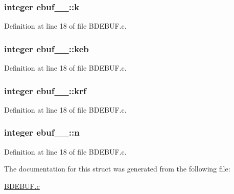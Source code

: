 \subsubsection[{\texorpdfstring{k}{k}}]{\setlength{\rightskip}{0pt plus 5cm}integer ebuf\+\_\+\_\+\+::k}\hypertarget{structebuf__1___a875fe82be4f3439c75f7fe6a957cc627}{}\label{structebuf__1___a875fe82be4f3439c75f7fe6a957cc627}


Definition at line 18 of file B\+D\+E\+B\+U\+F.\+c.

\subsubsection[{\texorpdfstring{keb}{keb}}]{\setlength{\rightskip}{0pt plus 5cm}integer ebuf\+\_\+\_\+\+::keb}\hypertarget{structebuf__1___a252e20996ef31e6f6d45c39d989cd92e}{}\label{structebuf__1___a252e20996ef31e6f6d45c39d989cd92e}


Definition at line 18 of file B\+D\+E\+B\+U\+F.\+c.

\subsubsection[{\texorpdfstring{krf}{krf}}]{\setlength{\rightskip}{0pt plus 5cm}integer ebuf\+\_\+\_\+\+::krf}\hypertarget{structebuf__1___a22af4603b3dc6305472541a0cf3ace7f}{}\label{structebuf__1___a22af4603b3dc6305472541a0cf3ace7f}


Definition at line 18 of file B\+D\+E\+B\+U\+F.\+c.

\subsubsection[{\texorpdfstring{n}{n}}]{\setlength{\rightskip}{0pt plus 5cm}integer ebuf\+\_\+\_\+\+::n}\hypertarget{structebuf__1___a414af32eb93e84eacea28886c1eb0093}{}\label{structebuf__1___a414af32eb93e84eacea28886c1eb0093}


Definition at line 18 of file B\+D\+E\+B\+U\+F.\+c.



The documentation for this struct was generated from the following file\+:\begin{DoxyCompactItemize}
\item 
\hyperlink{BDEBUF_8c}{B\+D\+E\+B\+U\+F.\+c}\end{DoxyCompactItemize}
